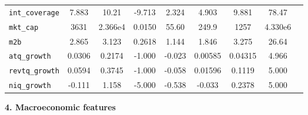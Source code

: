 \documentclass[12pt]{article}
\begin{document}
\begin{singlespace}
\begin{table}[H]
{\begin{tabular}{lcccccccc}
\texttt{int\_coverage} & 7.883 & 10.21 & -9.713 & 2.324 & 4.903 & 9.881 & 78.47 \\
\texttt{mkt\_cap} & 3631 & 2.366e4 & 0.0150 & 55.60 & 249.9 & 1257 & 4.330e6 \\
\texttt{m2b} & 2.865 & 3.123 & 0.2618 & 1.144 & 1.846 & 3.275 & 26.64 \\
\texttt{atq\_growth} & 0.0306 & 0.2174 & -1.000 & -0.023 & 0.00585 & 0.04315 & 4.966 \\
\texttt{revtq\_growth} & 0.0594 & 0.3745 & -1.000 & -0.058 & 0.01596 & 0.1119 & 5.000 \\
\texttt{niq\_growth} & -0.111 & 1.158 & -5.000 & -0.538 & -0.033 & 0.2378 & 5.000 \\
\bottomrule
\end{tabular}}
\end{table}
\end{singlespace}

\textbf{4. Macroeconomic features}
\end{document}
